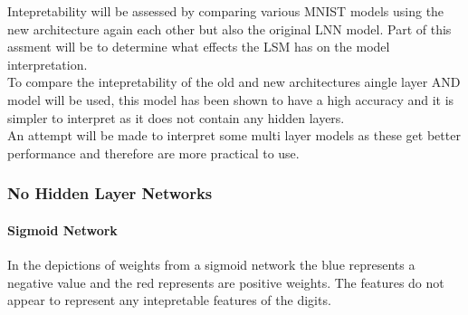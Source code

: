 Intepretability will be assessed by comparing various MNIST models using the new architecture again each other but also the original LNN model. Part of this assment will be to determine what effects the LSM has on the model interpretation.\\

To compare the intepretability of the old and new architectures aingle layer AND model will be used, this model has been shown to have a high accuracy and it is simpler to interpret as it does not contain any hidden layers.\\

An attempt will be made to interpret some multi layer models as these get better performance and therefore are more practical to use.

\subsubsection{No Hidden Layer Networks}
\paragraph{Sigmoid Network}
In the depictions of weights from a sigmoid network the blue represents a negative value and the red represents are positive weights. The features do not appear to represent any intepretable features of the digits.

